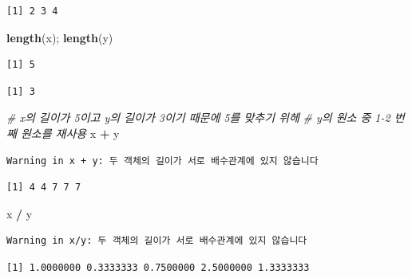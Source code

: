 \documentclass[
  11pt,
]{krantz}
\newenvironment{Shaded}{\begin{snugshade}}{\end{snugshade}}
\newcommand{\CommentTok}[1]{\textcolor[rgb]{0.37,0.37,0.37}{\textit{#1}}}
\newcommand{\KeywordTok}[1]{\textcolor[rgb]{0.27,0.27,0.27}{\textbf{#1}}}
\newcommand{\NormalTok}[1]{#1}
\newcommand{\OperatorTok}[1]{\textcolor[rgb]{0.43,0.43,0.43}{\textbf{#1}}}
\newcommand{\StringTok}[1]{\textcolor[rgb]{0.5,0.5,0.5}{#1}}
\begin{document}
\begin{verbatim}
[1] 2 3 4
\end{verbatim}

\begin{Shaded}
\begin{Highlighting}[]
\KeywordTok{length}\NormalTok{(x); }\KeywordTok{length}\NormalTok{(y)}
\end{Highlighting}
\end{Shaded}

\begin{verbatim}
[1] 5
\end{verbatim}

\begin{verbatim}
[1] 3
\end{verbatim}

\begin{Shaded}
\begin{Highlighting}[]
\CommentTok{# x의 길이가 5이고 y의 길이가 3이기 때문에 5를 맞추기 위헤}
\CommentTok{# y의 원소 중 1-2 번째 원소를 재사용}
\NormalTok{x }\OperatorTok{+}\StringTok{ }\NormalTok{y}
\end{Highlighting}
\end{Shaded}

\begin{verbatim}
Warning in x + y: 두 객체의 길이가 서로 배수관계에 있지 않습니다
\end{verbatim}

\begin{verbatim}
[1] 4 4 7 7 7
\end{verbatim}

\begin{Shaded}
\begin{Highlighting}[]
\NormalTok{x }\OperatorTok{/}\StringTok{ }\NormalTok{y}
\end{Highlighting}
\end{Shaded}

\begin{verbatim}
Warning in x/y: 두 객체의 길이가 서로 배수관계에 있지 않습니다
\end{verbatim}

\begin{verbatim}
[1] 1.0000000 0.3333333 0.7500000 2.5000000 1.3333333
\end{verbatim}
\end{document}
